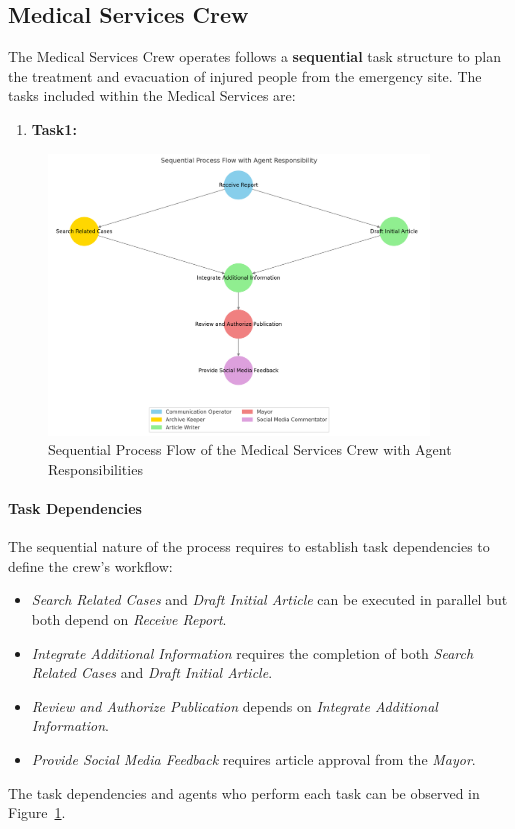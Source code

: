 \subsection{Medical Services Crew}

The Medical Services Crew operates follows a \textbf{sequential} task structure to plan the treatment and evacuation of injured people from the emergency site. The tasks included within the Medical Services are:

\begin{enumerate}
	\item \textbf{Task1:}
\end{enumerate}

\begin{figure}[h!]
	\centering
	\includegraphics[width=0.9\textwidth]{figures/PC-process.png}
	\caption{Sequential Process Flow of the Medical Services Crew with Agent Responsibilities}
	\label{fig:medical_services_flow}
\end{figure}


\paragraph{Task Dependencies}
The sequential nature of the process requires to establish task dependencies to define the crew's workflow:
\begin{itemize}
	\item \textit{Search Related Cases} and \textit{Draft Initial Article} can be executed in parallel but both depend on \textit{Receive Report}.
	\item \textit{Integrate Additional Information} requires the completion of both \textit{Search Related Cases} and \textit{Draft Initial Article}.
	\item \textit{Review and Authorize Publication} depends on \textit{Integrate Additional Information}.
	\item \textit{Provide Social Media Feedback} requires article approval from the \textit{Mayor}.
\end{itemize}

The task dependencies and agents who perform each task can be observed in Figure~\ref{fig:medical_services_flow}.
